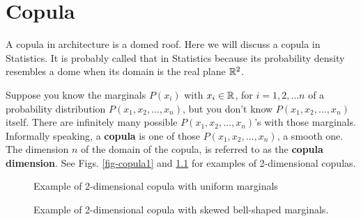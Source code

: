 \chapter{Copula}
\label{ch-copula}

A copula in architecture is a domed roof. Here we will discuss a copula in Statistics.
It is probably called that in Statistics
because its probability density resembles a dome when its domain is 
the real plane ${ \mathbb{R}}^2$.

Suppose you know the marginals $P(x_i)$ with $x_i\in { \mathbb{R}}$, for
$i=1,2, \ldots n$ 
of a probability distribution $P(x_1, x_2, \ldots, x_n)$,
but you don't know $P(x_1, x_2, \ldots, x_n)$
itself. There are
infinitely many
possible $P(x_1, x_2, \ldots, x_n)$'s
with those marginals.
Informally
speaking,
a {\bf copula} is one of those
$P(x_1, x_2, \ldots, x_n)$, a smooth one.
The dimension $n$ of
the domain of the copula,
is referred to as the
{\bf copula dimension}.
See Figs. \ref{fig-copula1}
and \ref{fig-copula2}
for examples of 2-dimensional copulas.

\begin{figure}[!h]
\begin{floatrow}
 {\caption{Example of 2-dimensional copula
 with uniform marginals}
 \label{fig-copula1}}
 {\caption{Example of 2-dimensional copula
 with skewed bell-shaped marginals.}
 \label{fig-copula2}}
\end{floatrow}
\end{figure}





